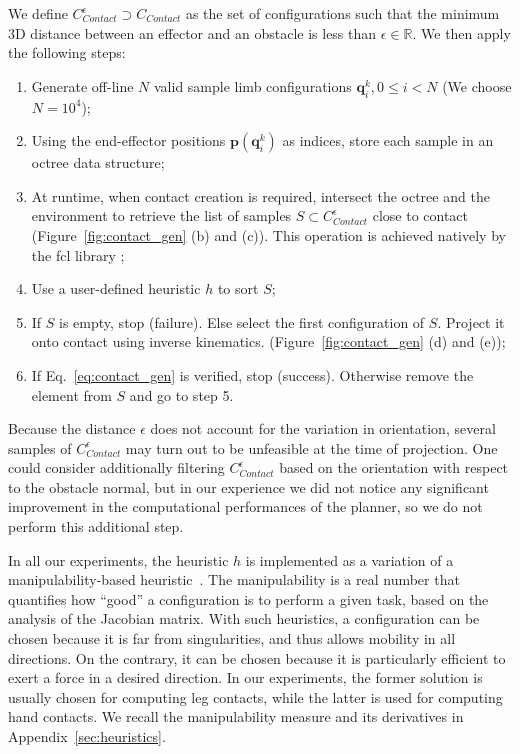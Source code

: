 
We define $C_{Contact}^{\epsilon} \supset C_{Contact}$ as the set of configurations such that the minimum 3D distance 
between an effector and an obstacle is less than $\epsilon \in \mathbb{R}$.
We then apply the following steps:
\begin{enumerate}
\item Generate off-line $N$ valid sample limb configurations $\mathbf{q}^k_i,  0 \leq i < N$ (We choose $N=10^4$);
\item Using the end-effector positions $\mathbf{p}(\mathbf{q}^k_i)$ as indices, store each sample in an octree data structure;
\item At runtime, when contact creation is required, intersect the octree and the environment to retrieve the list of samples $S \subset C_{Contact}^{\epsilon}$ close to contact (Figure~\ref{fig:contact_gen} (b) and (c)). This operation is achieved natively by the fcl library \cite{6225337};
\item Use a user-defined heuristic $h$ to sort $S$;
\item If $S$ is empty, stop (failure). Else select the first configuration of $S$. Project it onto contact using inverse kinematics. (Figure~\ref{fig:contact_gen} (d) and (e));
\item If Eq.~\ref{eq:contact_gen} is verified, stop (success). Otherwise remove the element from $S$ and go to step 5.
\end{enumerate}

Because the distance $\epsilon$ does not account for the variation in orientation, several samples of $ C_{Contact}^{\epsilon}$  may turn out to be unfeasible at the time of projection. One could consider additionally filtering $ C_{Contact}^{\epsilon}$ based on the orientation with respect to the obstacle normal, but in our experience we did not notice
any significant improvement in the computational performances of the planner, so we do not perform this additional step. 
 
In all our experiments, the heuristic $h$ is implemented as a variation of a manipulability-based heuristic~\cite{Yoshikawa1984}. The manipulability is a real number that quantifies how 
``good'' a configuration is to perform a given task, based on the analysis of the Jacobian matrix. With such heuristics, a configuration can be chosen because it is far from singularities, and thus allows mobility in all directions. On the contrary, it can be chosen because it is particularly efficient to exert a force in a desired direction. In our experiments, the former solution is usually chosen for computing leg contacts, while the latter is used for computing hand contacts. We recall the manipulability measure and its derivatives in Appendix~\ref{sec:heuristics}.

